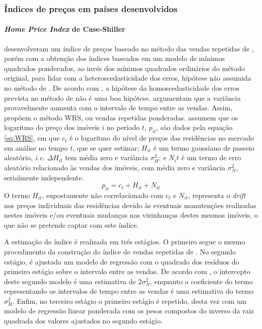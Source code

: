 \documentclass[
	12pt,				%
	oneside,			%
	a4paper,			%
	chapter=TITLE,		%
	section=TITLE,		%
	english,			%
	brazil				%
	]{abntex2}
\begin{document}
\begin{refsection}
\hypertarget{uxedndices-de-preuxe7os-em-pauxedses-desenvolvidos}{%
\subsubsection{Índices de preços em países desenvolvidos}\label{uxedndices-de-preuxe7os-em-pauxedses-desenvolvidos}}

\hypertarget{home-price-index-de-case-shiller}{%
\paragraph{\texorpdfstring{\emph{Home Price Index} de Case-Shiller}{Home Price Index de Case-Shiller}}\label{home-price-index-de-case-shiller}}

\textcite{repeatedSales} desenvolveram um índice de preços baseado no método das vendas
repetidas de \textcite{bailey1963}, porém com a obtenção dos índices baseados em um
modelo de mínimos quadrados ponderados, ao invés dos mínimos quadrados
ordinários do método original, para lidar com a heteroscedasticidade dos erros,
hipótese não assumida no método de \textcite{bailey1963}. De acordo com \textcite{repeatedSales}, a
hipótese da homoscedasticidade dos erros prevista no método de \textcite{bailey1963} não é
uma boa hipótese. \textcite{repeatedSales} argumentam que a variância provavelmente
aumenta com o intervalo de tempo entre as vendas. Assim, \textcite{repeatedSales} propõem
o método \gls{WRS}, ou vendas repetidas ponderadas. \textcite{repeatedSales} assumem que
os logaritmo do preço dos imóveis \(i\) no período \(t\), \(p_{it}\), são dados pela
equação \eqref{eq:WRS}, em que \(c_t\) é o logaritmo do nível de preços das
residências no mercado em análise no tempo \(t\), que se quer estimar; \(H_{it}\) é
um termo gaussiano de passeio aleatório, \emph{i.e.} \(\Delta H_{it}\) tem média zero
e variância \(\sigma_H^2\); e \(N_it\) é um termo de erro aleatório relacionado às
vendas dos imóveis, com média zero e variância \(\sigma_N^2\), serialmente
independente.
\begin{equation}
\label{eq:WRS}
p_{it} = c_t + H_{it}+N_{it}
\end{equation}
O termo \(H_{it}\), supostamente não correlacionado com \(c_t\) e \(N_{it}\),
representa o \emph{drift} nos preços individuais das residências devido às eventuais
manutenções realizadas nestes imóveis e/ou eventuais mudanças nas vizinhanças
destes mesmos imóveis, o que não se pretende captar com este índice.

A estimação do índice é realizada em três estágios. O primeiro segue o mesmo
procedimento da construção do índice de vendas repetidas de \textcite{bailey1963}. No
segundo estágio, é ajustado um modelo de regressão com o quadrado dos resíduos
do primeiro estágio sobre o intervalo entre as vendas. De acordo com
\textcite{repeatedSales}, o intercepto deste segundo modelo é uma estimativa de
\(2\sigma^2_N\), enquanto o coeficiente do termo representando os intervalos de
tempo entre as vendas é uma estimativa do termo \(\sigma^2_H\). Enfim, no
terceiro estágio o primeiro estágio é repetido, desta vez com um modelo de
regressão linear ponderada com os pesos compostos do inverso da raiz quadrada
dos valores ajustados no segundo estágio.


\end{refsection}
\end{document}

